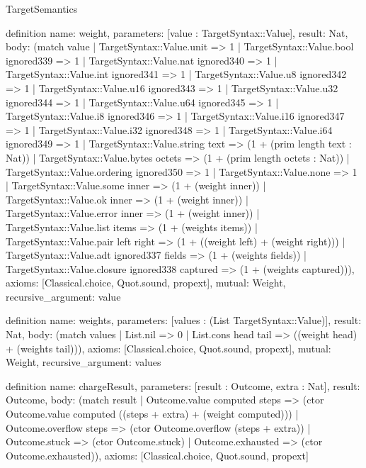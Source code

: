 \begin{lexlean}{TargetSemantics}
\begin{semanticmodule}
definition{
  name: weight,
  parameters: [value : TargetSyntax::Value],
  result: Nat,
  body: (match value
    | TargetSyntax::Value.unit => 1
    | TargetSyntax::Value.bool ignored339 => 1
    | TargetSyntax::Value.nat ignored340 => 1
    | TargetSyntax::Value.int ignored341 => 1
    | TargetSyntax::Value.u8 ignored342 => 1
    | TargetSyntax::Value.u16 ignored343 => 1
    | TargetSyntax::Value.u32 ignored344 => 1
    | TargetSyntax::Value.u64 ignored345 => 1
    | TargetSyntax::Value.i8 ignored346 => 1
    | TargetSyntax::Value.i16 ignored347 => 1
    | TargetSyntax::Value.i32 ignored348 => 1
    | TargetSyntax::Value.i64 ignored349 => 1
    | TargetSyntax::Value.string text => (1 + (prim length text : Nat))
    | TargetSyntax::Value.bytes octets => (1 + (prim length octets : Nat))
    | TargetSyntax::Value.ordering ignored350 => 1
    | TargetSyntax::Value.none => 1
    | TargetSyntax::Value.some inner => (1 + (weight inner))
    | TargetSyntax::Value.ok inner => (1 + (weight inner))
    | TargetSyntax::Value.error inner => (1 + (weight inner))
    | TargetSyntax::Value.list items => (1 + (weights items))
    | TargetSyntax::Value.pair left right => (1 + ((weight left) + (weight right)))
    | TargetSyntax::Value.adt ignored337 fields => (1 + (weights fields))
    | TargetSyntax::Value.closure ignored338 captured => (1 + (weights captured))),
  axioms: [Classical.choice, Quot.sound, propext],
  mutual: Weight,
  recursive_argument: value
}

definition{
  name: weights,
  parameters: [values : (List TargetSyntax::Value)],
  result: Nat,
  body: (match values | List.nil => 0 | List.cons head tail => ((weight head) + (weights tail))),
  axioms: [Classical.choice, Quot.sound, propext],
  mutual: Weight,
  recursive_argument: values
}

definition{
  name: chargeResult,
  parameters: [result : Outcome, extra : Nat],
  result: Outcome,
  body: (match result
    | Outcome.value computed steps => (ctor Outcome.value computed ((steps + extra) + (weight computed)))
    | Outcome.overflow steps => (ctor Outcome.overflow (steps + extra))
    | Outcome.stuck => (ctor Outcome.stuck)
    | Outcome.exhausted => (ctor Outcome.exhausted)),
  axioms: [Classical.choice, Quot.sound, propext]
}


\end{semanticmodule}
\end{lexlean}

